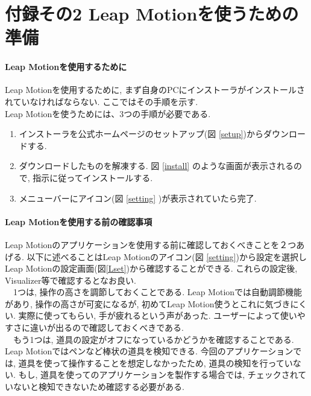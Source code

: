\documentclass{funthesis}
\begin{document}
\chapter*{付録その2 Leap Motionを使うための準備}
\subsubsection{Leap Motionを使用するために}
Leap Motionを使用するために, まず自身のPCにインストーラがインストールされていなければならない. ここではその手順を示す.\\



Leap Motionを使うためには、3つの手順が必要である. 
\begin{enumerate}
 \item インストーラを公式ホームページのセットアップ(図 \ref{setup})からダウンロードする.
 \item ダウンロードしたものを解凍する. 図 \ref{install} のような画面が表示されるので, 指示に従ってインストールする. 
 \item メニューバーにアイコン(図 \ref{setting} )が表示されていたら完了. 
\end{enumerate}

\subsubsection{Leap Motionを使用する前の確認事項}
Leap Motionのアプリケーションを使用する前に確認しておくべきことを２つあげる. 以下に述べることはLeap Motionのアイコン(図 \ref{setting})から設定を選択しLeap Motionの設定画面(図\ref{Lset})から確認することができる. これらの設定後, Visualizer等で確認するとなお良い. \\
　1つは, 操作の高さを調節しておくことである. Leap Motionでは自動調節機能があり, 操作の高さが可変になるが, 初めてLeap Motion使うとこれに気づきにくい. 実際に使ってもらい, 手が疲れるという声があった. ユーザーによって使いやすさに違いが出るので確認しておくべきである. \\
　もう1つは, 道具の設定がオフになっているかどうかを確認することである. Leap Motionではペンなど棒状の道具を検知できる. 今回のアプリケーションでは, 道具を使って操作することを想定しなかったため, 道具の検知を行っていない. もし, 道具を使ってのアプリケーションを製作する場合では, チェックされていないと検知できないため確認する必要がある. \\
\end{document}
